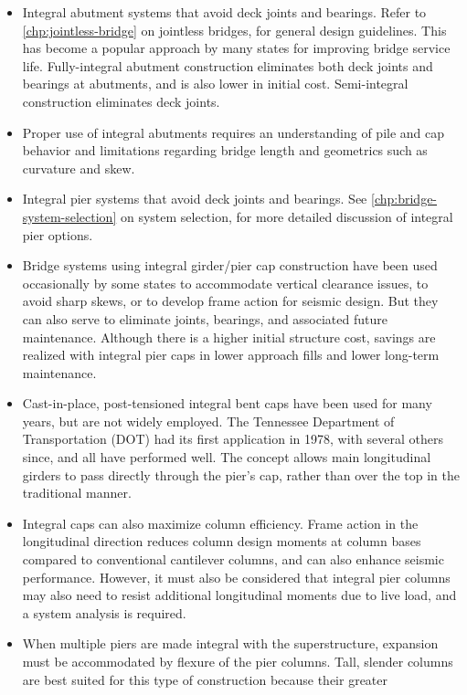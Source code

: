 \begin{itemize}
  \item Integral abutment systems that avoid deck joints and bearings. Refer to \cref{chp:jointless-bridge} on jointless bridges, for
  general design guidelines. This has become a popular approach by many states for improving bridge service
  life. Fully-integral abutment construction eliminates both deck joints and bearings at abutments, and is also
  lower in initial cost. Semi-integral construction eliminates deck joints.
  \item Proper use of integral abutments requires an understanding of pile and cap behavior and limitations regarding
  bridge length and geometrics such as curvature and skew.
  \item Integral pier systems that avoid deck joints and bearings. See \cref{chp:bridge-system-selection} on system selection, for more
  detailed discussion of integral pier options.
  \item Bridge systems using integral girder/pier cap construction have been used occasionally by some states to
  accommodate vertical clearance issues, to avoid sharp skews, or to develop frame action for seismic design.
  But they can also serve to eliminate joints, bearings, and associated future maintenance. Although there is a
  higher initial structure cost, savings are realized with integral pier caps in lower approach fills and lower
  long-term maintenance.
  \item Cast-in-place, post-tensioned integral bent caps have been used for many years, but are not widely employed.
  The Tennessee Department of Transportation (DOT) had its first application in 1978, with several others
  since, and all have performed well. The concept allows main longitudinal girders to pass directly through the
  pier’s cap, rather than over the top in the traditional manner.
  \item Integral caps can also maximize column efficiency. Frame action in the longitudinal direction reduces
  column design moments at column bases compared to conventional cantilever columns, and can also enhance seismic performance. However, it must also be considered that integral pier columns may also need to resist
  additional longitudinal moments due to live load, and a system analysis is required.
  \item When multiple piers are made integral with the superstructure, expansion must be accommodated by flexure
  of the pier columns. Tall, slender columns are best suited for this type of construction because their greater

\end{itemize}

